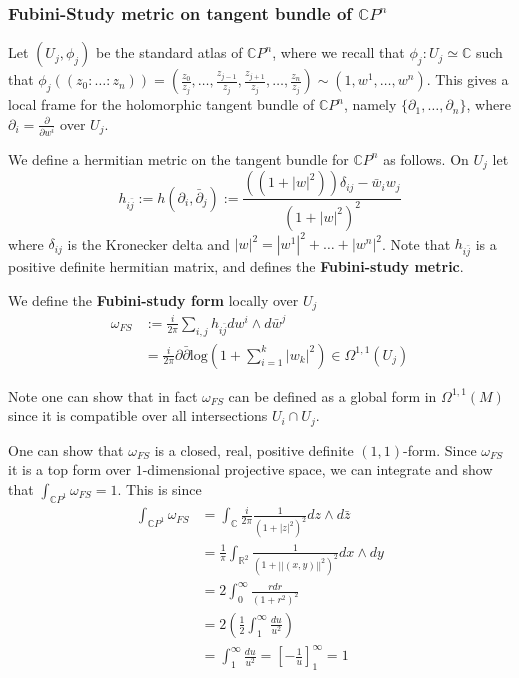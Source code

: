 \documentclass[a4paper]{article}
\theoremstyle{definition} \newtheorem*{definition}{Definition}
\theoremstyle{definition} \newtheorem*{definitions}{Definitions}
\theoremstyle{plain} \newtheorem{theorem}{Theorem}[section]
\theoremstyle{plain} \newtheorem{proposition}[theorem]{Proposition}
\theoremstyle{plain} \newtheorem{corollary}[theorem]{Corollary}
\theoremstyle{plain} \newtheorem{lemma}[theorem]{Lemma}
\theoremstyle{plain} \newtheorem{example}[theorem]{Example}
\newcommand{\defn}[1]{\textbf{#1}}
\newcommand{\realnos}{\mathbb{R}}
\newcommand{\complexnos}{\mathbb{C}}
\begin{document}
\subsubsection{Fubini-Study metric on tangent bundle of $\complexnos P^n$}
Let $(U_j, \phi_j)$ be the standard atlas of $\complexnos P^n$, where we recall that $\phi_j:U_j\simeq \complexnos$ such that $\phi_j((z_0 : \ldots : z_n))=(\frac{z_0}{z_j}, \ldots, \frac{z_{j-1}}{z_j}, \frac{z_{j+1}}{z_j}, \ldots, \frac{z_n}{z_j})\sim (1, w^1, \ldots, w^n)$. This gives a local frame for the holomorphic tangent bundle of $\complexnos P^n$, namely $\{\partial_1, \ldots, \partial_n\}$, where $\partial_i=\frac{\partial}{\partial w^i}$ over $U_j$. 

We define a hermitian metric on the tangent bundle for $\complexnos P^n$ as follows. On $U_j$ let
$$h_{i\bar{j}}:=h(\partial_i,\bar{\partial}_j):=\frac{((1+|w|^2))\delta_{ij}-\bar{w}
_i w_j}{(1+|w|^2)^2}$$
where $\delta_{ij}$ is the Kronecker delta and $|w|^2 = |w^1|^2 + \ldots + |w^n|^2$. Note that $h_{i\bar{j}}$ is a positive definite hermitian matrix, and defines the \defn{Fubini-study metric}. 

We define the \defn{Fubini-study form} locally over $U_j$
\begin{align*}
    \omega_{FS} & := \frac{i}{2\pi} \sum_{i, j} h_{i\bar{j}} dw^i \wedge d\bar{w}^j \\
 & = \frac{i}{2\pi} \partial \bar{\partial} \text{log} \left( 1 + \sum_{i=1}^k |w_k|^2  \right) \in \Omega^{1,1}(U_j)
\end{align*}


Note one can show that in fact $\omega_{FS}$ can be defined as a global form in $\Omega^{1,1}(M)$ since it is compatible over all intersections $U_i\cap U_j$. 

One can show that $\omega_{FS}$ is a closed, real, positive definite $(1,1)$-form. Since $\omega_{FS}$ it is a top form over $1$-dimensional projective space, we can integrate and show that $\int_{\complexnos P^1} \omega_{FS}=1$. This is since
\begin{align*}
  \int_{\complexnos P^1} \omega_{FS} & = \int_\complexnos \frac{i}{2\pi}\frac{1}{(1+|z|^2)^2}dz\wedge d\bar{z}\\
  & = \frac{1}{\pi}\int_{\realnos^2}\frac{1}{(1+||(x,y)||^2)^2}dx\wedge dy \\
  & = 2 \int_0^\infty \frac{rdr}{(1+r^2)^2} \\
  & = 2 \left( \frac{1}{2} \int_1^\infty \frac{du}{u^2 }\right) \\
  & = \int_1^\infty \frac{du}{u^2}  = \left[ - \frac{1}{u} \right]_1^\infty = 1
\end{align*}
\end{document}
